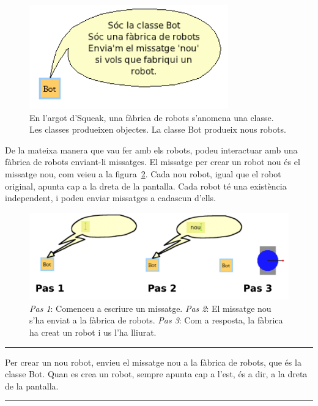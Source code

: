 \begin{figure}[h]
\begin{center}
\includegraphics[height=45mm ,width=86mm ]{Imatges/figura1-9.png}
\end{center}
\caption{En l'argot d'Squeak, una fàbrica de robots s'anomena una classe. Les classes produeixen objectes. La classe \textsf{\upshape Bot} produeix nous robots.}
\label{fig0109}
\end{figure}

De la mateixa manera que vau fer amb els robots, podeu interactuar amb una fàbrica de robots enviant-li missatges. El missatge per crear un robot nou és el missatge \textsf{nou}, com veieu a la figura~\ref{fig0110}. Cada nou robot, igual que el robot original, apunta cap a la dreta de la pantalla. Cada robot té una existència independent, i podeu enviar missatges a cadascun d'ells.

\begin{figure}[h]
\begin{center}
\includegraphics[scale=0.75]{Imatges/figura1-10}
\end{center}
\caption{\emph{Pas 1}: Comenceu a escriure un missatge.
 \emph{Pas 2}:  El missatge \textsf{\upshape nou} s'ha enviat a la fàbrica de robots.
\emph{Pas 3}: Com a resposta, la fàbrica ha creat un robot i us l'ha lliurat.}
\label{fig0110}
\end{figure}

\noindent
\rule{\textwidth}{2pt}
\noindent
Per crear un nou robot, envieu el missatge \textsf{nou} a la fàbrica de robots, que és la classe \textsf{Bot}. Quan es crea un robot, sempre apunta cap a l'\textsf{est}, és a dir, a la dreta de la pantalla.\\
\noindent
\rule{\textwidth}{2pt}

